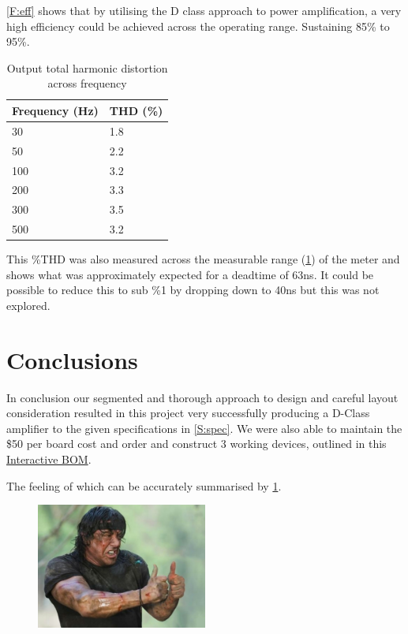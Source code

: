 \documentclass[11pt]{article}
\begin{document}
{\cref{F:eff} shows that by utilising the D class approach to power amplification, a very high efficiency could be achieved across the operating range. Sustaining 85\% to 95\%.  

\begin{table}[h!]
  \centering
  \begin{tabular}{l|l}
  \rowcolor[HTML]{E0E0E0} 
  \textbf{Frequency (Hz)} & \textbf{THD (\%)} \\ \hline
  30                 & 1.8               \\
  50                 & 2.2               \\
  100                & 3.2               \\
  200                & 3.3               \\
  300                & 3.5               \\
  500                & 3.2              
  \end{tabular}
  \caption{Output total harmonic distortion across frequency}
  \label{T:THD}
\end{table}

This \%THD was also measured across the measurable range (\cref{T:THD}) of the meter and shows what was approximately expected for a deadtime of 63ns. It could be possible to reduce this to sub \%1 by dropping down to 40ns but this was not explored.   

\newpage
\section{Conclusions}
 
In conclusion our segmented and thorough approach to design and careful layout consideration resulted in this project very successfully producing a D-Class amplifier to the given specifications in \cref{S:spec}. We were also able to maintain the \$50 per board cost and order and construct 3 working devices, outlined in this \href{https://niels-clayton.github.io/D-Class\_Amplifier/}{Interactive BOM}.

The feeling of which can be accurately summarised by \cref{F:thumbs}.
\begin{figure}[h!]
  \centering
  \includegraphics[width=0.5\textwidth]{img/thumbs.png}  
  \caption{}
  \label{F:thumbs}
\end{figure}

}
\end{document}
